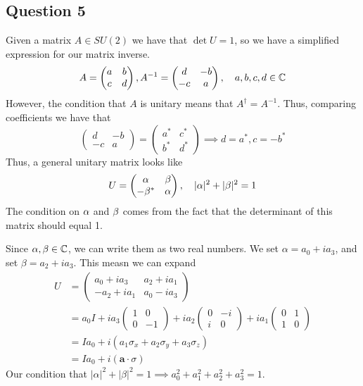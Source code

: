 \subsection{Question 5} 

Given a matrix $A \in SU (2)$ we have that $\det U = 1 $, so we have a simplified expression for our matrix inverse. 
\[ 
A = \begin{pmatrix} a & b \\ c & d \end{pmatrix}, A^{ - 1}  = \begin{pmatrix} d & -b \\ - c& a \end{pmatrix}, \quad a, b, c, d \in \mathbb{ C}
\] However, the condition that $ A $ is unitary means that $ A^\dagger = A^{ -1 }$. Thus, comparing coefficients we have that 
\[
\begin{pmatrix} d & -b \\ - c& a \end{pmatrix} = \begin{pmatrix} a^* & c^* \\ b^* & d^* \end{pmatrix} \implies d = a^*, c  = - b^*
\] Thus, a general unitary matrix looks like 
\[ 
U  = \begin{pmatrix} \alpha & \beta \\  - \beta^* & \alpha \end{pmatrix}, \quad  |\alpha|^2 + | \beta|^2  = 1
\] The condition on $\alpha $ and $\beta $ comes from the fact that the determinant of this matrix should equal 1. 

Since  $\alpha, \beta \in \mathbb{ C}$, we can write them as two real numbers.
We set $ \alpha  = a_0 + i a_3 $, and set $ \beta = a_2 + i a_3 $. 
This measn we can expand 
\begin{align*}
U &= \begin{pmatrix} a_0 + i a_3 & a_2 + i a_1 \\ - a_2 + i a_1 & a_0 - i a_3  \end{pmatrix} \\
&= a_0 I + i a_3 \begin{pmatrix} 1 & 0 \\ 0 & -1  \end{pmatrix} + i a_2 \begin{pmatrix}  0 & -i \\ i & 0  \end{pmatrix} + i a_1 \begin{pmatrix}  0 & 1 \\ 1 & 0  \end{pmatrix}  \\
&= I a_0 + i ( a_1 \sigma_{ x } + a_2 \sigma_{ y } + a_3 \sigma_{ z } ) \\
&= I a_0 + i ( \mathbf{ a} \cdot  \sigma ) 
\end{align*}
Our condition that $ | \alpha | ^ 2 + | \beta | ^ 2  = 1 \implies a_0 ^ 2 + a_1 ^ 2 + a_2 ^ 2 + a_3 ^2 = 1 $. 

